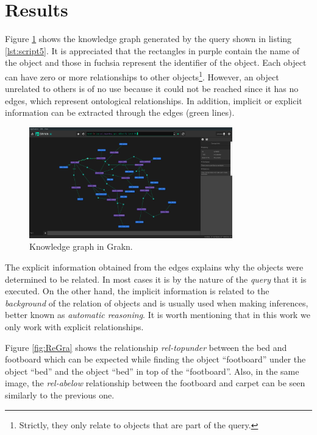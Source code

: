 \section{Results}
\label{sec:results}
Figure \ref{fig:grafGra} shows the knowledge graph generated by the query shown in listing \ref{lst:script5}. It is appreciated that the rectangles in purple contain the name of the object and those in fuchsia represent the identifier of the object. Each object can have zero or more relationships to other objects\footnote{Strictly, they only relate to objects that are part of the query.}. However, an object unrelated to others is of no use because it could not be reached since it has no edges, which represent ontological relationships. In addition, implicit or explicit information can be extracted through the edges (green lines).



\begin{figure}[H]
    \centering
    \includegraphics[width=8.8cm]{figures/allrel.png}
    \caption{Knowledge graph in Grakn.}
    \label{fig:grafGra}
\end{figure}

The explicit information obtained from the edges explains why the objects were determined to be related. In most cases it is by the nature of the \textit{query} that it is executed. On the other hand, the implicit information is related to the \textit{background} of the relation of objects and is usually used when making inferences, better known as \textit{automatic reasoning}. It is worth mentioning that in this work we only work with explicit relationships.

Figure \ref{fig:ReGra} shows the relationship \textit{rel-topunder} between the bed and footboard which can be expected while finding the object ``footboard'' under the object ``bed'' and the object ``bed'' in top of the ``footboard''. Also, in the same image, the \textit{rel-abelow} relationship between the footboard and carpet can be seen similarly to the previous one.

